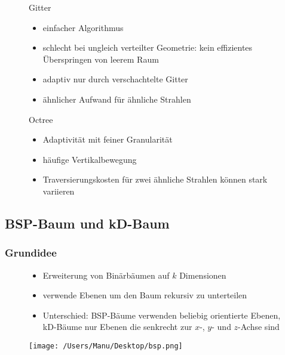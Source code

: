 \documentclass[paper=a4, fontsize=11pt]{scrartcl} %
\numberwithin{equation}{section} %
\numberwithin{figure}{section} %
\numberwithin{table}{section} %
\begin{document}
\begin{figure}[htbp]
\begin{minipage}[t]{6cm}
\vspace{0pt}
Gitter
\begin{itemize}
\item einfacher Algorithmus
\item schlecht bei ungleich verteilter Geometrie: kein effizientes Überspringen von leerem Raum
\item adaptiv nur durch verschachtelte Gitter
\item ähnlicher Aufwand für ähnliche Strahlen
\end{itemize}
\end{minipage}
\hfill
\begin{minipage}[t]{6cm}
\vspace{0pt}
Octree
\begin{itemize}
\item Adaptivität mit feiner Granularität
\item häufige Vertikalbewegung
\item Traversierungskosten für zwei ähnliche Strahlen können stark variieren
\end{itemize}
\end{minipage}
\end{figure}
\newpage
\subsection{BSP-Baum und kD-Baum}

\subsubsection{Grundidee}

\begin{figure}[htbp]
\begin{minipage}[t]{6cm}
\vspace{0pt}
\begin{itemize}
\item Erweiterung von Binärbäumen auf $k$ Dimensionen
\item verwende Ebenen um den Baum rekursiv zu unterteilen
\item Unterschied: BSP-Bäume verwenden beliebig orientierte Ebenen, kD-Bäume nur Ebenen die senkrecht zur $x$-, $y$- und $z$-Achse sind
\end{itemize}
\end{minipage}
\hfill
\begin{minipage}[t]{6cm}
\vspace{0pt}
\centering
\texttt{[image: /Users/Manu/Desktop/bsp.png]}
\end{minipage}
\end{figure}
\end{document}
